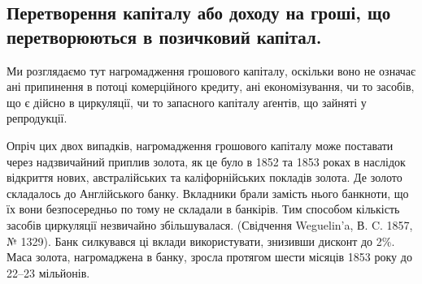 \subsection{Перетворення капіталу або доходу на гроші, що перетворюються
в позичковий капітал.}

Ми розглядаємо тут нагромадження грошового капіталу, оскільки воно не
означає ані припинення в потоці комерційного кредиту, ані економізування, чи
то засобів, що є дійсно в циркуляції, чи то запасного капіталу аґентів, що зайняті
у репродукції.

Опріч цих двох випадків, нагромадження грошового капіталу може поставати
через надзвичайний приплив золота, як це було в 1852 та 1853 роках
в наслідок відкриття нових, австралійських та каліфорнійських покладів золота.
Де золото складалось до Англійського банку. Вкладники брали замість нього
банкноти, що їх вони безпосередньо по тому не складали в банкірів. Тим способом
кількість засобів циркуляції незвичайно збільшувалася. (Свідчення Weguelin’a,
В. C. 1857, № 1329). Банк силкувався ці вклади використувати, знизивши
дисконт до 2\%. Маса золота, нагромаджена в банку, зросла протягом
шести місяців 1853 року до 22--23 мільйонів.
